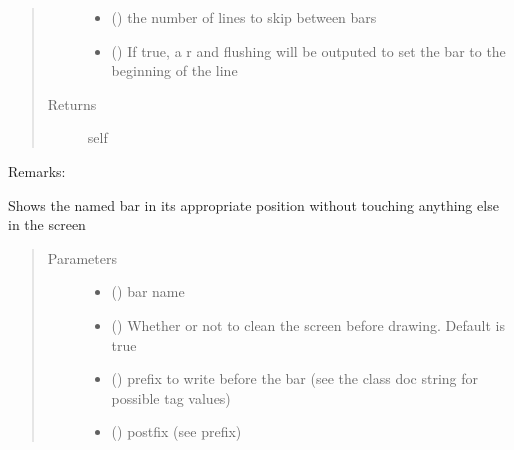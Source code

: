 \documentclass[a4paper,10pt,english]{sphinxmanual}
\begin{document}
\begin{fulllineitems}
\begin{fulllineitems}
\begin{quote}
\begin{description}
\begin{itemize}
\item {} 
 () \textendash{} the number of lines to skip between bars

\item {} 
 () \textendash{} If true, a r and flushing will be outputed to set the bar to the beginning of the line

\end{itemize}

\item[{Returns}] \leavevmode
self

\end{description}\end{quote}

Remarks:

\end{fulllineitems}


\begin{fulllineitems}
\label{\detokenize{api/termtools.terminal.ProgressBarController:termtools.terminal.ProgressBarController.show_in_position}}
Shows the named bar in its appropriate position without touching anything else in the screen
\begin{quote}\begin{description}
\item[{Parameters}] \leavevmode\begin{itemize}
\item {} 
 () \textendash{} bar name

\item {} 
 () \textendash{} Whether or not to clean the screen before drawing. Default is true

\item {} 
 () \textendash{} prefix to write before the bar (see the class doc string for possible tag values)

\item {} 
 () \textendash{} postfix (see prefix)


\end{itemize}
\end{description}
\end{quote}
\end{fulllineitems}
\end{fulllineitems}
\end{document}
